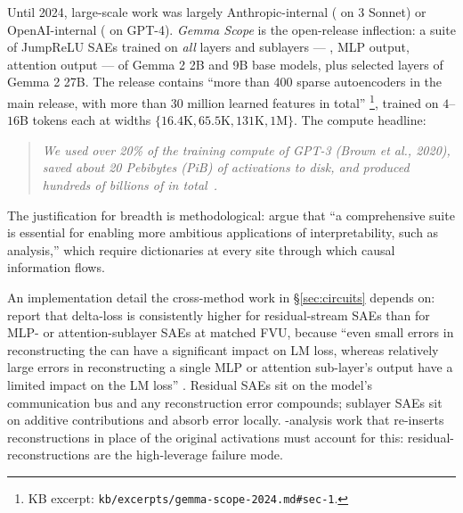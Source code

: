 Until 2024, large-scale  work was largely Anthropic-internal
(\citealp{templeton2024-scaling-monosemanticity} on  3 Sonnet)
or OpenAI-internal (\citealp{gao2024-topk-saes} on GPT-4). \emph{Gemma
Scope} \citep{gemma-scope-2024} is the open-release inflection: a
suite of JumpReLU SAEs trained on \emph{all} layers and sublayers ---
, MLP output, attention output --- of Gemma 2 2B and
9B base models, plus selected layers of Gemma 2 27B. The release
contains ``more than 400 sparse autoencoders in the main release, with
more than 30 million learned features in total''
\citep[\S 1]{gemma-scope-2024}\footnote{KB excerpt:
\nolinkurl{kb/excerpts/gemma-scope-2024.md#sec-1}.}, trained on
$4$--$16$B tokens each at widths $\{16.4\text{K}, 65.5\text{K},
131\text{K}, 1\text{M}\}$. The compute headline:
\begin{quote}
\itshape
We used over 20\% of the training compute of GPT-3 (Brown et al., 2020),
saved about 20 Pebibytes (PiB) of activations to disk, and produced
hundreds of billions of   in
total~\citep[\S 1]{gemma-scope-2024}.
\end{quote}
The justification for breadth is methodological:
\citet[\S 1]{gemma-scope-2024} argue that
``a comprehensive suite is essential for enabling more ambitious
applications of interpretability, such as  analysis,'' which
require  dictionaries at every site through which causal
information flows.

An implementation detail the cross-method work in
\S\ref{sec:circuits} depends on: \citet[\S 4.1]{gemma-scope-2024} report that
delta-loss is consistently higher for residual-stream SAEs than for
MLP- or attention-sublayer SAEs at matched FVU, because
``even small errors in reconstructing the  can have a
significant impact on LM loss, whereas relatively large errors in
reconstructing a single MLP or attention sub-layer's output have a
limited impact on the LM loss'' \citep[\S 4.1]{gemma-scope-2024}.
Residual SAEs sit on the model's communication bus and any
reconstruction error compounds; sublayer SAEs sit on additive
contributions and absorb error locally. -analysis work that
re-inserts  reconstructions in place of the original activations
must account for this: residual- reconstructions are the
high-leverage failure mode.

